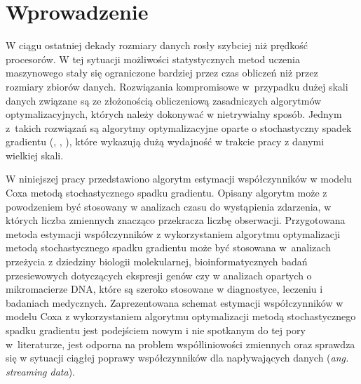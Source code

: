 \chapter*{Wprowadzenie}

W ciągu ostatniej dekady rozmiary danych rosły szybciej niż prędkość procesorów. W tej sytuacji możliwości statystycznych metod uczenia maszynowego stały się ograniczone bardziej przez czas obliczeń niż przez rozmiary zbiorów danych. Rozwiązania kompromisowe w~przypadku dużej skali danych związane są ze złożonością obliczeniową zasadniczych algorytmów optymalizacyjnych, których należy dokonywać w nietrywialny sposób. Jednym z~takich rozwiązań są algorytmy optymalizacyjne oparte o stochastyczny spadek gradientu (\cite{bott1}, \cite{bott2}, \cite{widrow2}), które wykazują dużą wydajność w trakcie pracy z danymi wielkiej skali.

W niniejszej pracy przedstawiono algorytm estymacji współczynników w modelu Coxa metodą stochastycznego spadku gradientu. Opisany algorytm może z powodzeniem być stosowany w analizach czasu do wystąpienia zdarzenia, w których liczba zmiennych znacząco przekracza liczbę obserwacji. Przygotowana metoda estymacji współczynników z wykorzystaniem algorytmu optymalizacji metodą stochastycznego spadku gradientu może być stosowana w~analizach przeżycia z dziedziny biologii molekularnej, bioinformatycznych badań przesiewowych dotyczących ekspresji genów czy w analizach opartych o mikromacierze DNA, które są szeroko stosowane w diagnostyce, leczeniu i badaniach medycznych. Zaprezentowana schemat estymacji współczynników w modelu Coxa z wykorzystaniem algorytmu optymalizacji metodą stochastycznego spadku gradientu jest podejściem nowym i nie spotkanym do tej pory w~literaturze, jest odporna na problem współliniowości zmiennych oraz sprawdza się w sytuacji ciągłej poprawy współczynników dla napływających danych (\textit{ang. streaming data}).

